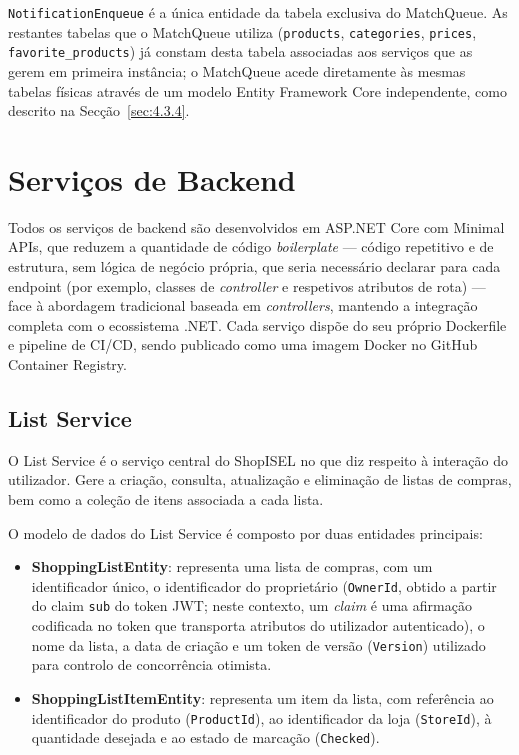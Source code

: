 \texttt{NotificationEnqueue} é a única entidade da tabela exclusiva do MatchQueue. As restantes tabelas que o MatchQueue utiliza (\texttt{products}, \texttt{categories}, \texttt{prices}, \texttt{favorite\_products}) já constam desta tabela associadas aos serviços que as gerem em primeira instância; o MatchQueue acede diretamente às mesmas tabelas físicas através de um modelo Entity Framework Core independente, como descrito na Secção~\ref{sec:4.3.4}.

\section{Serviços de Backend}
\label{sec:4.2}

Todos os serviços de backend são desenvolvidos em ASP.NET Core com Minimal \ac{API}s, que reduzem a quantidade de código \textit{boilerplate} — código repetitivo e de estrutura, sem lógica de negócio própria, que seria necessário declarar para cada endpoint (por exemplo, classes de \textit{controller} e respetivos atributos de rota) — face à abordagem tradicional baseada em \textit{controllers}, mantendo a integração completa com o ecossistema .NET. Cada serviço dispõe do seu próprio Dockerfile e pipeline de \ac{CI/CD}, sendo publicado como uma imagem Docker no GitHub Container Registry.

\subsection{List Service}
\label{sec:4.2.1}

O List Service é o serviço central do ShopISEL no que diz respeito à interação do utilizador. Gere a criação, consulta, atualização e eliminação de listas de compras, bem como a coleção de itens associada a cada lista.

O modelo de dados do List Service é composto por duas entidades principais:

\begin{itemize}
    \item \textbf{ShoppingListEntity}: representa uma lista de compras, com um identificador único, o identificador do proprietário (\texttt{OwnerId}, obtido a partir do claim \texttt{sub} do token \ac{JWT}; neste contexto, um \textit{claim} é uma afirmação codificada no token que transporta atributos do utilizador autenticado), o nome da lista, a data de criação e um token de versão (\texttt{Version}) utilizado para controlo de concorrência otimista.
    \item \textbf{ShoppingListItemEntity}: representa um item da lista, com referência ao identificador do produto (\texttt{ProductId}), ao identificador da loja (\texttt{StoreId}), à quantidade desejada e ao estado de marcação (\texttt{Checked}).
\end{itemize}

